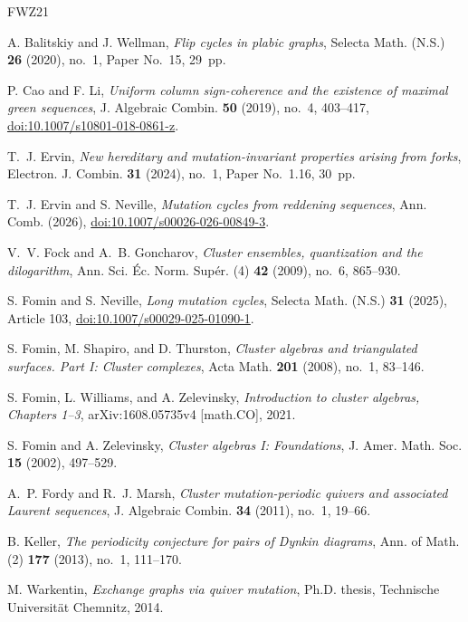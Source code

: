 \documentclass[10pt,a4paper]{amsart}
\theoremstyle{definition}
\theoremstyle{definition}
\numberwithin{equation}{section}
\numberwithin{table}{section}
\begin{document}
\begin{thebibliography}{FWZ21}

A. Balitskiy and J. Wellman,
\emph{Flip cycles in plabic graphs},
Selecta Math. (N.S.) \textbf{26} (2020), no.~1, Paper No.~15, 29~pp.

P. Cao and F. Li,
\emph{Uniform column sign-coherence and the existence of maximal green sequences},
J. Algebraic Combin. \textbf{50} (2019), no.~4, 403--417,
\href{https://doi.org/10.1007/s10801-018-0861-z}{doi:10.1007/s10801-018-0861-z}.

T.~J. Ervin,
\emph{New hereditary and mutation-invariant properties arising from forks},
Electron. J. Combin. \textbf{31} (2024), no.~1, Paper No.~1.16, 30~pp.

T.~J. Ervin and S. Neville,
\emph{Mutation cycles from reddening sequences},
Ann. Comb. (2026),
\href{https://doi.org/10.1007/s00026-026-00849-3}{doi:10.1007/s00026-026-00849-3}.

V.~V. Fock and A.~B. Goncharov,
\emph{Cluster ensembles, quantization and the dilogarithm},
Ann. Sci. \'{E}c. Norm. Sup\'{e}r. (4) \textbf{42} (2009), no.~6, 865--930.

S. Fomin and S. Neville,
\emph{Long mutation cycles},
Selecta Math. (N.S.) \textbf{31} (2025), Article 103,
\href{https://doi.org/10.1007/s00029-025-01090-1}{doi:10.1007/s00029-025-01090-1}.

S. Fomin, M. Shapiro, and D. Thurston,
\emph{Cluster algebras and triangulated surfaces. Part I: Cluster complexes},
Acta Math. \textbf{201} (2008), no.~1, 83--146.

S. Fomin, L. Williams, and A. Zelevinsky,
\emph{Introduction to cluster algebras, Chapters 1--3},
arXiv:1608.05735v4 [math.CO], 2021.

S. Fomin and A. Zelevinsky,
\emph{Cluster algebras I: Foundations},
J. Amer. Math. Soc. \textbf{15} (2002), 497--529.

A.~P. Fordy and R.~J. Marsh,
\emph{Cluster mutation-periodic quivers and associated Laurent sequences},
J. Algebraic Combin. \textbf{34} (2011), no.~1, 19--66.

B. Keller,
\emph{The periodicity conjecture for pairs of Dynkin diagrams},
Ann. of Math. (2) \textbf{177} (2013), no.~1, 111--170.

M. Warkentin,
\emph{Exchange graphs via quiver mutation},
Ph.D. thesis, Technische Universit\"at Chemnitz, 2014.

\end{thebibliography}
\end{document}
